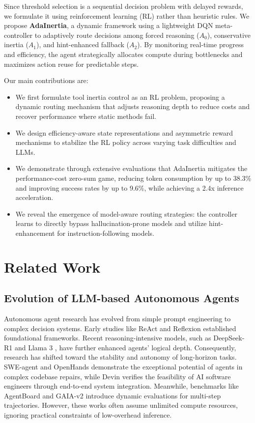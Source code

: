 \documentclass[runningheads]{llncs}
\begin{document}
Since threshold selection is a sequential decision problem with delayed rewards, we formulate it using reinforcement learning (RL) rather than heuristic rules. We propose \textbf{AdaInertia}, a dynamic framework using a lightweight DQN \cite{dqn} meta-controller to adaptively route decisions among forced reasoning ($A_0$), conservative inertia ($A_1$), and hint-enhanced fallback ($A_2$). By monitoring real-time progress and efficiency, the agent strategically allocates compute during bottlenecks and maximizes action reuse for predictable steps.

Our main contributions are:
\begin{itemize}
    \item We first formulate tool inertia control as an RL problem, proposing a dynamic routing mechanism that adjusts reasoning depth to reduce costs and recover performance where static methods fail.
    \item We design efficiency-aware state representations and asymmetric reward mechanisms to stabilize the RL policy across varying task difficulties and LLMs.
    \item We demonstrate through extensive evaluations that AdaInertia mitigates the performance-cost zero-sum game, reducing token consumption by up to 38.3\% and improving success rates by up to 9.6\%, while achieving a 2.4x inference acceleration.
    \item We reveal the emergence of model-aware routing strategies: the controller learns to directly bypass hallucination-prone models and utilize hint-enhancement for instruction-following models.
\end{itemize}

\section{Related Work}
\subsection{Evolution of LLM-based Autonomous Agents}
Autonomous agent research has evolved from simple prompt engineering to complex decision systems. Early studies like ReAct and Reflexion established foundational frameworks. Recent reasoning-intensive models, such as DeepSeek-R1 \cite{deepseekr1} and Llama 3 \cite{llama3}, have further enhanced agents' logical depth. Consequently, research has shifted toward the stability and autonomy of long-horizon tasks. SWE-agent \cite{sweagent} and OpenHands \cite{openhands} demonstrate the exceptional potential of agents in complex codebase repairs, while Devin \cite{devin} verifies the feasibility of AI software engineers through end-to-end system integration. Meanwhile, benchmarks like AgentBoard \cite{agentboard} and GAIA-v2 \cite{gaia} introduce dynamic evaluations for multi-step trajectories. However, these works often assume unlimited compute resources, ignoring practical constraints of low-overhead inference.
\end{document}
